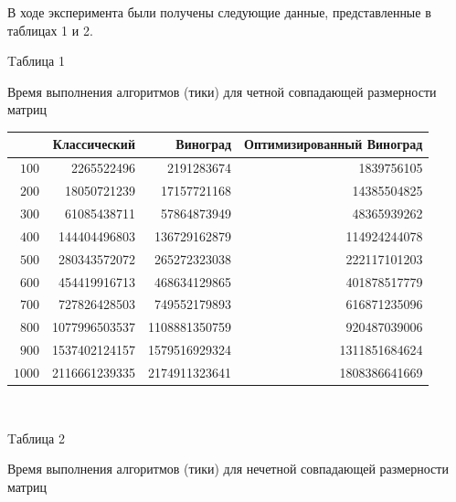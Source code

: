 \documentclass[12pt,a4paper]{scrartcl}
\begin{document}
В ходе эксперимента были получены следующие данные, представленные в таблицах 1 и 2.
\\

\begin {flushright}
	Tаблица 1
\end {flushright}
\null \hfill Время выполнения алгоритмов (тики) для четной совпадающей размерности матриц
\begin{table}[ht]
	\label{time2}
	\centering
	\begin{tabular}{|r|r|r|r|}          
		\cline{1-4} & {Классический} & {Виноград} & {Оптимизированный Виноград} \\
		\hline $100$ &	2265522496 & 2191283674 & 1839756105\\
		\hline $200$ &	18050721239 & 17157721168 & 14385504825\\
		\hline $300$ & 61085438711 & 57864873949 & 48365939262\\
		\hline $400$ &	144404496803 & 136729162879 & 114924244078\\
		\hline $500$ &	280343572072 & 265272323038 & 222117101203\\
		\hline $600$ &	454419916713 & 468634129865 & 401878517779\\
		\hline $700$ &	727826428503 & 749552179893 & 616871235096\\
		\hline $800$ &	1077996503537 & 1108881350759 & 920487039006\\
		\hline $900$ &	1537402124157 & 1579516929324 & 1311851684624\\
		\hline $1000$ & 2116661239335 & 2174911323641 & 1808386641669\\
		\hline
	\end{tabular}
\end{table}
\\
\begin {flushright}
	Tаблица 2
\end {flushright}
\null \hfill Время выполнения алгоритмов (тики) для нечетной совпадающей размерности матриц
\end{document}
